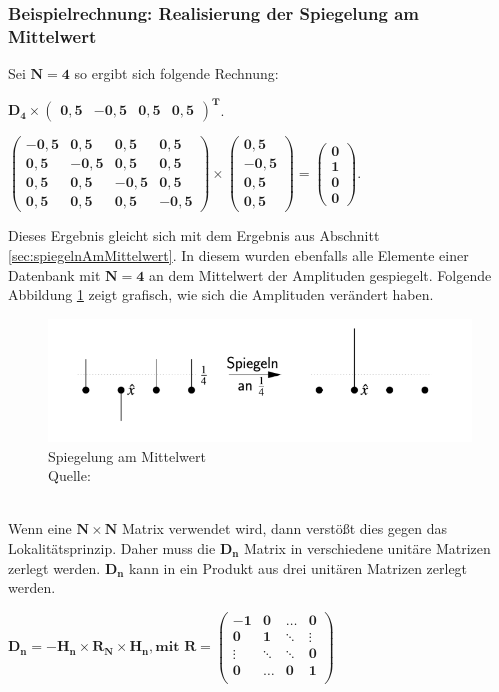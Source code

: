 \subsubsection{Beispielrechnung: Realisierung der Spiegelung am Mittelwert}
\label{seg:bspSpiegelungAmMittelwert}
Sei $\mathbf{N = 4}$ so ergibt sich folgende Rechnung:
\begin{center}
	$\mathbf{D_4  \times \begin{pmatrix}
			0,5 & -0,5 & 0,5 & 0,5
		\end{pmatrix}^T}$.
	
	$\mathbf{\begin{pmatrix}
			-0,5 & 0,5 &0,5&0,5\\
			0,5 & -0,5 &0,5&0,5\\
			0,5 & 0,5 &-0,5&0,5\\
			0,5 & 0,5 &0,5&-0,5
		\end{pmatrix}
		\times \begin{pmatrix} 0,5 \\ -0,5 \\ 0,5 \\ 0,5 \end{pmatrix} = \begin{pmatrix} 0\\1\\0\\0 \end{pmatrix}
	}$.
\end{center}
Dieses Ergebnis gleicht sich mit dem Ergebnis aus Abschnitt \ref{sec:spiegelnAmMittelwert}. In diesem wurden ebenfalls alle Elemente einer Datenbank mit $\mathbf{N=4}$ an dem Mittelwert der Amplituden gespiegelt. Folgende Abbildung \ref{fig:spiegelung} zeigt grafisch, wie sich die Amplituden verändert haben.
\begin{figure}[hbtp]
	\centering
	\includegraphics[width=.8\textwidth]{figures/spiegelung.png}
	\caption{Spiegelung am Mittelwert \\ Quelle: \cite[S. 142]{Ho17}}
	\label{fig:spiegelung}
\end{figure}
\noindent
\\
Wenn eine $\mathbf{N \times N}$ Matrix verwendet wird, dann verstößt dies gegen das Lokalitätsprinzip. Daher muss die $\mathbf{D_n}$ Matrix in verschiedene unitäre Matrizen zerlegt werden.  $\mathbf{D_n}$ kann in ein Produkt aus drei unitären Matrizen zerlegt werden.
\begin{center}
	$\mathbf{D_n = -H_n \times R_N \times H_n, \text{mit } R  = 
		\begin{pmatrix}
			-1 & 0 &\dots& 0 \\
			0& 1& \ddots& \vdots\\
			\vdots &\ddots& \ddots&0 \\
			0& \dots& 0 &1 \\
	\end{pmatrix}}$
\end{center}
